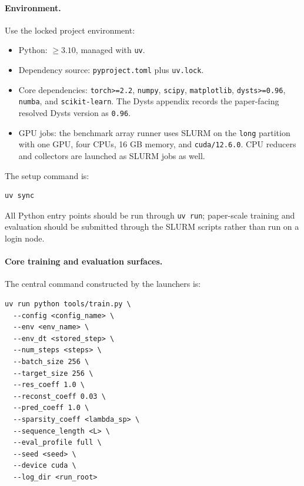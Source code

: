 \paragraph{Environment.}
Use the locked project environment:
\begin{itemize}
  \item Python: \(\geq 3.10\), managed with \texttt{uv}.
  \item Dependency source: \texttt{pyproject.toml} plus \texttt{uv.lock}.
  \item Core dependencies: \texttt{torch>=2.2}, \texttt{numpy},
  \texttt{scipy}, \texttt{matplotlib}, \texttt{dysts>=0.96},
  \texttt{numba}, and \texttt{scikit-learn}. The Dysts appendix records the
  paper-facing resolved Dysts version as \texttt{0.96}.
  \item GPU jobs: the benchmark array runner uses SLURM on the \texttt{long}
  partition with one GPU, four CPUs, 16 GB memory, and \texttt{cuda/12.6.0}.
  CPU reducers and collectors are launched as SLURM jobs as well.
\end{itemize}

The setup command is:
\begin{verbatim}
uv sync
\end{verbatim}

All Python entry points should be run through \texttt{uv run}; paper-scale
training and evaluation should be submitted through the SLURM scripts rather
than run on a login node.

\paragraph{Core training and evaluation surfaces.}
The central command constructed by the launchers is:
\begin{verbatim}
uv run python tools/train.py \
  --config <config_name> \
  --env <env_name> \
  --env_dt <stored_step> \
  --num_steps <steps> \
  --batch_size 256 \
  --target_size 256 \
  --res_coeff 1.0 \
  --reconst_coeff 0.03 \
  --pred_coeff 1.0 \
  --sparsity_coeff <lambda_sp> \
  --sequence_length <L> \
  --eval_profile full \
  --seed <seed> \
  --device cuda \
  --log_dir <run_root>
\end{verbatim}

